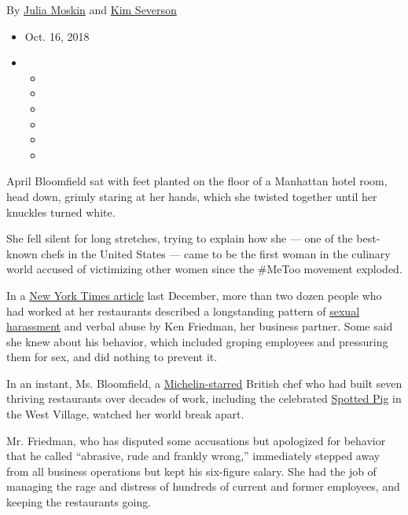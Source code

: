 By \href{https://www.nytimes3xbfgragh.onion/by/julia-moskin}{Julia
Moskin} and
\href{https://www.nytimes3xbfgragh.onion/by/kim-severson}{Kim Severson}

\begin{itemize}
\item
  Oct. 16, 2018
\item
  \begin{itemize}
  \item
  \item
  \item
  \item
  \item
  \item
  \end{itemize}
\end{itemize}

April Bloomfield sat with feet planted on the floor of a Manhattan hotel
room, head down, grimly staring at her hands, which she twisted together
until her knuckles turned white.

She fell silent for long stretches, trying to explain how she --- one of
the best-known chefs in the United States --- came to be the first woman
in the culinary world accused of victimizing other women since the
\#MeToo movement exploded.

In a
\href{https://www.nytimes3xbfgragh.onion/2017/12/12/dining/ken-friedman-sexual-harassment.html}{New
York Times article} last December, more than two dozen people who had
worked at her restaurants described a longstanding pattern of
\href{https://www.nytimes3xbfgragh.onion/2018/08/20/dining/mario-batali-spotted-pig.html}{sexual
harassment} and verbal abuse by Ken Friedman, her business partner. Some
said she knew about his behavior, which included groping employees and
pressuring them for sex, and did nothing to prevent it.

In an instant, Ms. Bloomfield, a
\href{https://guide.michelin.com/us/new-york/spotted-pig/restaurant}{Michelin-starred}
British chef who had built seven thriving restaurants over decades of
work, including the celebrated
\href{https://www.thespottedpig.com/\#home}{Spotted Pig} in the West
Village, watched her world break apart.

Mr. Friedman, who has disputed some accusations but apologized for
behavior that he called ``abrasive, rude and frankly wrong,''
immediately stepped away from all business operations but kept his
six-figure salary. She had the job of managing the rage and distress of
hundreds of current and former employees, and keeping the restaurants
going.

